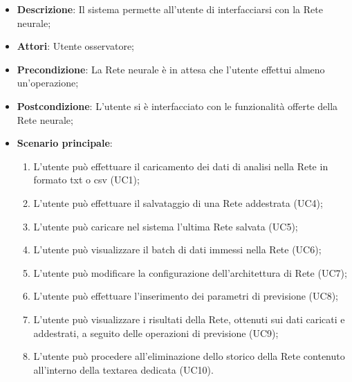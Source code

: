 \begin{itemize}
\item \textbf{Descrizione}: Il sistema permette all'utente di interfacciarsi con la Rete neurale;
\item \textbf{Attori}: Utente osservatore;
\item \textbf{Precondizione}: La Rete neurale \`e in attesa che l'utente effettui almeno un'operazione;
\item \textbf{Postcondizione}: L'utente si \`e interfacciato con le funzionalit\`a offerte della Rete neurale;
\item \textbf{Scenario principale}:
\begin{enumerate}
\item L'utente pu\`o effettuare il caricamento dei dati di analisi nella Rete in formato txt o csv (UC1);
\item L'utente pu\`o effettuare il salvataggio di una Rete addestrata (UC4);
\item L'utente pu\`o caricare nel sistema l'ultima Rete salvata (UC5);
\item L'utente pu\`o visualizzare il batch di dati immessi nella Rete (UC6);
\item L'utente pu\`o modificare la configurazione dell'architettura di Rete (UC7);
\item L'utente pu\`o effettuare  l'inserimento dei parametri di previsione (UC8);
\item L'utente pu\`o visualizzare i risultati della Rete, ottenuti sui dati caricati e addestrati, a seguito delle operazioni di previsione (UC9);
\item L'utente pu\`o procedere all'eliminazione dello storico della Rete contenuto all'interno della textarea dedicata (UC10).

\end{enumerate}
\end{itemize}

